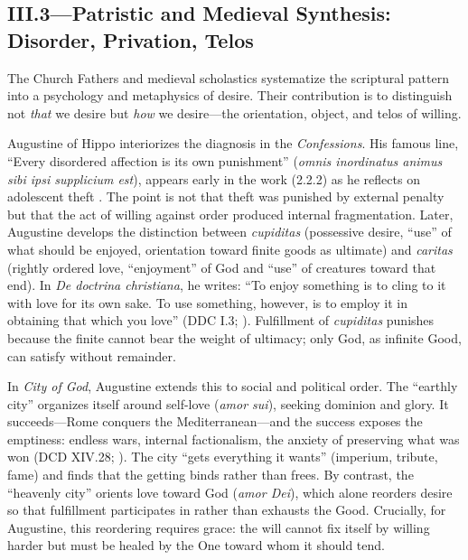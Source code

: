 \subsection*{III.3—Patristic and Medieval Synthesis: Disorder, Privation, Telos}
\label{ssec:iii-patristic-medieval}

The Church Fathers and medieval scholastics systematize the scriptural pattern into a
psychology and metaphysics of desire. Their contribution is to distinguish not \emph{that} we
desire but \emph{how} we desire---the orientation, object, and telos of willing.

Augustine of Hippo interiorizes the diagnosis in the \emph{Confessions}. His famous line,
``Every disordered affection is its own punishment'' (\emph{omnis inordinatus animus sibi ipsi
	supplicium est}), appears early in the work (2.2.2) as he reflects on adolescent theft
\parencite[p.~47]{AugustineConfessions1998}. The point is not that theft was punished by
external penalty but that the act of willing against order produced internal fragmentation.
Later, Augustine develops the distinction between \emph{cupiditas} (possessive desire, ``use''
of what should be enjoyed, orientation toward finite goods as ultimate) and \emph{caritas}
(rightly ordered love, ``enjoyment'' of God and ``use'' of creatures toward that end). In
\emph{De doctrina christiana}, he writes: ``To enjoy something is to cling to it with love for
its own sake. To use something, however, is to employ it in obtaining that which you love''
(DDC I.3; \parencite[p.~9]{AugustineDeDoctrina1958}). Fulfillment of \emph{cupiditas}
punishes because the finite cannot bear the weight of ultimacy; only God, as infinite Good,
can satisfy without remainder.

In \emph{City of God}, Augustine extends this to social and political order. The ``earthly
city'' organizes itself around self-love (\emph{amor sui}), seeking dominion and glory. It
succeeds---Rome conquers the Mediterranean---and the success exposes the emptiness: endless
wars, internal factionalism, the anxiety of preserving what was won (DCD XIV.28;
\parencite{AugustineCity2003}). The city ``gets everything it wants'' (imperium, tribute,
fame) and finds that the getting binds rather than frees. By contrast, the ``heavenly city''
orients love toward God (\emph{amor Dei}), which alone reorders desire so that fulfillment
participates in rather than exhausts the Good. Crucially, for Augustine, this reordering
requires grace: the will cannot fix itself by willing harder but must be healed by the One
toward whom it should tend.

